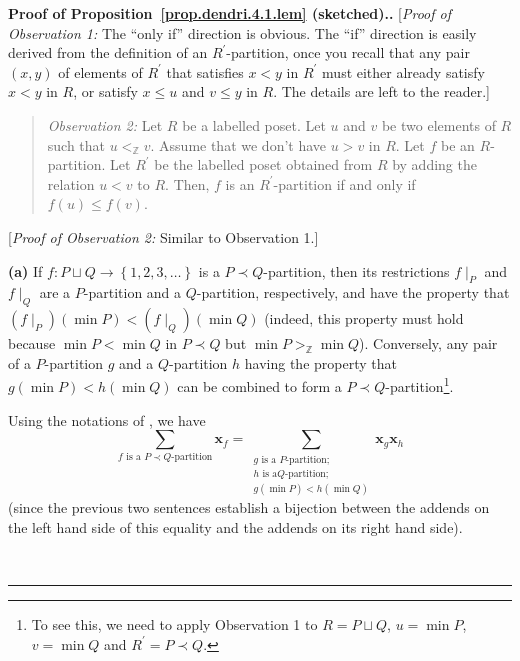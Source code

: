 \documentclass[numbers=enddot,12pt,final,onecolumn,notitlepage]{scrartcl}%
\theoremstyle{definition}
\newenvironment{statement}{\begin{quote}}{\end{quote}}
\newenvironment{proof}[1][Proof]{\noindent\textbf{#1.} }{\ \rule{0.5em}{0.5em}}
\newenvironment{verlong}{}{}
\newcommand{\ZZ}{\mathbb{Z}}
\let\sumnonlimits\sum
\renewcommand{\sum}{\sumnonlimits\limits}
\begin{document}
\begin{verlong}
\begin{proof}[Proof of Proposition~\ref{prop.dendri.4.1.lem} (sketched).]
[\textit{Proof of Observation 1:} The ``only if'' direction is obvious.
The ``if'' direction is easily derived from the definition of an
$R^{\prime}$-partition, once you recall that any pair
$\left(x, y\right)$ of elements of $R^{\prime}$ that satisfies $x < y$
in $R^{\prime}$ must either already satisfy $x < y$ in $R$, or satisfy
$x \leq u$ and $v \leq y$ in $R$. The details are left to the reader.]

\begin{statement}
\textit{Observation 2:} Let $R$ be a labelled poset. Let $u$ and $v$ be
two elements of $R$ such that $u <_{\ZZ} v$.
Assume that we don't have $u > v$ in $R$.
Let $f$ be an $R$-partition.
Let $R^{\prime}$ be the labelled poset obtained from $R$ by adding the
relation $u < v$ to $R$.
Then, $f$ is an $R^{\prime}$-partition if and only if
$f \left(u\right) \leq f\left(v\right)$.
\end{statement}

[\textit{Proof of Observation 2:} Similar to Observation 1.]

\textbf{(a)} If $f : P \sqcup Q \to \left\{1,2,3,\ldots\right\}$ is a
$P \left. \prec \right. Q$-partition, then its restrictions $f\mid_P$
and $f\mid_Q$ are a $P$-partition and a $Q$-partition, respectively, and
have the property that
$\left(f\mid_P\right) \left( \min P \right) < \left(f\mid_Q\right) \left( \min Q \right)$
(indeed, this property must hold because $\min P < \min Q$ in
$P \left. \prec \right. Q$ but $\min P >_{\ZZ} \min Q$).
Conversely, any pair of a $P$-partition $g$ and a $Q$-partition $h$
having the property that $g \left(\min P\right) < h \left(\min Q\right)$
can be combined to form a
$P \left. \prec \right. Q$-partition\footnote{To see this, we need to
apply Observation 1 to $R = P \sqcup Q$, $u = \min P$, $v = \min Q$
and $R^{\prime} = P \left. \prec \right. Q$.}.

Using the notations of \cite[Definition 5.2.1]{HopfComb}, we have
\begin{equation}
\sum_{f\text{ is a }P\left.  \prec\right.  Q\text{-partition}}\mathbf{x}%
_{f}=\sum_{\substack{g\text{ is a }P\text{-partition;}\\h\text{ is a
}Q\text{-partition;}\\g\left(  \min P\right)  <h\left(  \min Q\right)
}}\mathbf{x}_{g}\mathbf{x}_{h}\label{pf.prop.dendri.4.1.lem.a.1}%
\end{equation}
(since the previous two sentences establish a bijection between the addends on
the left hand side of this equality and the addends on its right hand side).


\end{proof}
\end{verlong}
\end{document}

